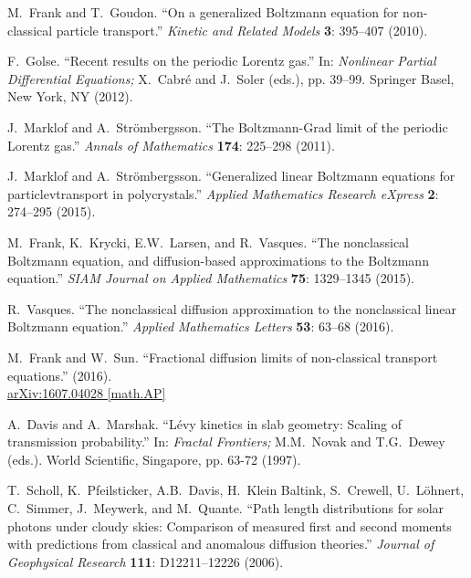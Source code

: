 \documentclass[12pt]{article}
\begin{document}
\begin{thebibliography}{10}
M.~Frank and T.~Goudon.
``On a generalized Boltzmann equation for non-classical particle transport.''
\textit{Kinetic and Related Models} \textbf{3}: 395--407 (2010).
\vspace{-5pt}

F.~Golse.
``Recent results on the periodic Lorentz gas.''
In: \textit{Nonlinear Partial Differential Equations;} X.~Cabr\'e and J.~Soler (eds.), pp. 39--99.
Springer Basel, New York, NY (2012).
\vspace{-5pt}

J.~Marklof and A.~Str\"ombergsson.
``The Boltzmann-Grad limit of the periodic Lorentz gas.''
\textit{Annals of Mathematics} \textbf{174}: 225--298 (2011).
\vspace{-5pt}

J.~Marklof and A.~Str\"ombergsson.
``Generalized linear Boltzmann equations for particlevtransport in polycrystals.''
\textit{Applied Mathematics Research eXpress} \textbf{2}: 274--295 (2015).
\vspace{-5pt}

M.~Frank, K.~Krycki, E.W.~Larsen, and R.~Vasques.
``The nonclassical Boltzmann equation, and diffusion-based approximations to the Boltzmann equation.''
\textit{SIAM Journal on Applied Mathematics} \textbf{75}: 1329--1345 (2015). \vspace{-5pt}

R.~Vasques.
``The nonclassical diffusion approximation to the nonclassical linear Boltzmann equation.''
\textit{Applied Mathematics Letters} \textbf{53}: 63--68 (2016).
\vspace{-5pt}

M.~Frank and W.~Sun.
``Fractional diffusion limits of non-classical transport equations.'' (2016).\\
\href{http://arxiv.org/pdf/1607.04028.pdf}{arXiv:1607.04028 [math.AP]}
\vspace{-5pt}

A.~Davis and A.~Marshak.
``L\'evy kinetics in slab geometry: Scaling of transmission probability.''
In: \textit{Fractal Frontiers;} M.M.~Novak and T.G.~Dewey (eds.).
World Scientific, Singapore, pp. 63-72 (1997).
\vspace{-5pt}

T.~Scholl, K.~Pfeilsticker, A.B.~Davis, H.~Klein Baltink, S.~Crewell, U.~L\"ohnert, C.~Simmer, J.~Meywerk, and M.~Quante.
``Path length distributions for solar photons under cloudy skies: Comparison of measured first and second moments with predictions from classical and anomalous diffusion theories.''
\textit{Journal of Geophysical Research} \textbf{111}: D12211--12226 (2006).
\vspace{-5pt}


\end{thebibliography}
\end{document}
